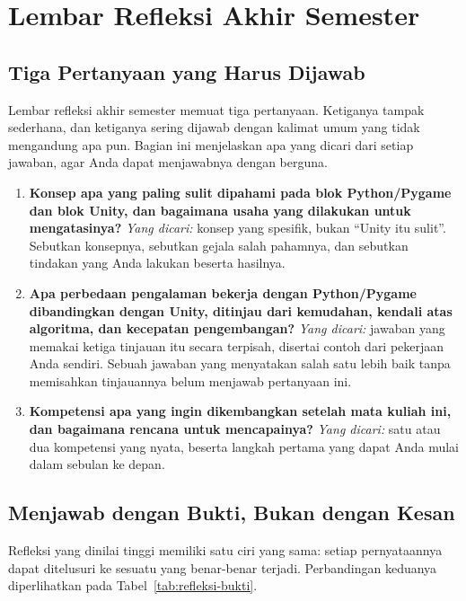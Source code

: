 \section{Lembar Refleksi Akhir Semester}
\label{sec:refleksi-akhir}

\subsection{Tiga Pertanyaan yang Harus Dijawab}

Lembar refleksi akhir semester memuat tiga pertanyaan. Ketiganya tampak
sederhana, dan ketiganya sering dijawab dengan kalimat umum yang tidak
mengandung apa pun. Bagian ini menjelaskan apa yang dicari dari setiap
jawaban, agar Anda dapat menjawabnya dengan berguna.

\begin{enumerate}
  \item \textbf{Konsep apa yang paling sulit dipahami pada blok Python/Pygame
        dan blok Unity, dan bagaimana usaha yang dilakukan untuk
        mengatasinya?}
        \emph{Yang dicari:} konsep yang spesifik, bukan ``Unity itu sulit''.
        Sebutkan konsepnya, sebutkan gejala salah pahamnya, dan sebutkan
        tindakan yang Anda lakukan beserta hasilnya.
  \item \textbf{Apa perbedaan pengalaman bekerja dengan Python/Pygame
        dibandingkan dengan Unity, ditinjau dari kemudahan, kendali atas
        algoritma, dan kecepatan pengembangan?}
        \emph{Yang dicari:} jawaban yang memakai ketiga tinjauan itu secara
        terpisah, disertai contoh dari pekerjaan Anda sendiri. Sebuah jawaban
        yang menyatakan salah satu lebih baik tanpa memisahkan tinjauannya
        belum menjawab pertanyaan ini.
  \item \textbf{Kompetensi apa yang ingin dikembangkan setelah mata kuliah
        ini, dan bagaimana rencana untuk mencapainya?}
        \emph{Yang dicari:} satu atau dua kompetensi yang nyata, beserta
        langkah pertama yang dapat Anda mulai dalam sebulan ke depan.
\end{enumerate}

\subsection{Menjawab dengan Bukti, Bukan dengan Kesan}

Refleksi yang dinilai tinggi memiliki satu ciri yang sama: setiap pernyataannya
dapat ditelusuri ke sesuatu yang benar-benar terjadi. Perbandingan keduanya
diperlihatkan pada Tabel~\ref{tab:refleksi-bukti}.

